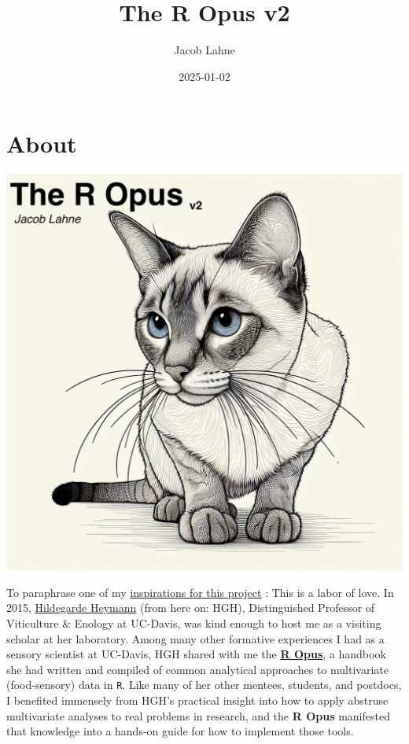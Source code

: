 \documentclass[
]{book}
\title{The R Opus v2}
\author{Jacob Lahne}
\date{2025-01-02}
\begin{document}
\maketitle

{
\setcounter{tocdepth}{1}
\tableofcontents
}
\chapter*{About}\label{about}

\begin{center}\includegraphics{img/r-opus-cover} \end{center}

To paraphrase one of my \href{https://bookdown.org/content/3890/}{inspirations for this project} \citep{kurzDoingBayesianDataAnalysis2023}: This is a labor of love. In 2015, \href{https://wineserver.ucdavis.edu/people/hildegarde-heymann\#/}{Hildegarde Heymann} (from here on: HGH), Distinguished Professor of Viticulture \& Enology at UC-Davis, was kind enough to host me as a visiting scholar at her laboratory. Among many other formative experiences I had as a sensory scientist at UC-Davis, HGH shared with me the \href{files/The\%20R\%20Opus\%20-\%20May\%202015.pdf}{\textbf{R Opus}}, a handbook she had written and compiled of common analytical approaches to multivariate (food-sensory) data in \texttt{R}. Like many of her other mentees, students, and postdocs, I benefited immensely from HGH's practical insight into how to apply abstruse multivariate analyses to real problems in research, and the \textbf{R Opus} manifested that knowledge into a hands-on guide for how to implement those tools.
\end{document}

